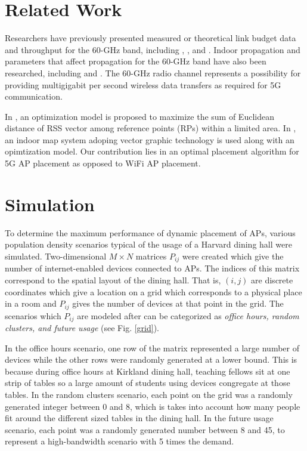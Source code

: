 \documentclass[conference]{IEEEtran}
\begin{document}
\section{Related Work}
	
Researchers have previously presented measured or theoretical link budget data and throughput for the 60-GHz band, including \cite{b2}, \cite{b3}, and \cite{b4}. Indoor propagation and parameters that affect propagation for the 60-GHz band have also been researched, including \cite{b5} and \cite{b6}. The 60-GHz radio channel represents a possibility for providing multigigabit per second wireless data transfers as required for 5G communication. 
	
In \cite{b7}, an optimization model is proposed to maximize the
sum of Euclidean distance of RSS vector among reference
points (RPs) within a limited area. In \cite{b8}, an indoor map system adoping vector graphic technology is used along with an opimtization model. Our contribution lies in an optimal placement algorithm for 5G AP placement as opposed to WiFi AP placement. 

\section{Simulation}

To determine the maximum performance of dynamic placement of APs, various
population density scenarios typical of the usage of a Harvard dining hall were
simulated. Two-dimensional $M\times N$ matrices $P_{ij}$ were created which give the number
of internet-enabled devices connected to APs. The indices of this matrix
correspond to the spatial layout of the dining hall. That is, $(i, j)$
are discrete coordinates which give a location on a grid which corresponds to a
physical place in a room and $P_{ij}$ gives the number of devices at that point
in the grid. The scenarios which $P_{ij}$ are
modeled after can be categorized as \textit{office hours, random clusters, and
future usage} (see Fig. \ref{grid}).

In the office hours scenario, one row of the matrix represented a large number of devices while the other rows were randomly generated at a lower bound. This is because during office hours at Kirkland dining hall, teaching fellows sit at one strip of tables so a large amount of students using devices congregate at those tables. In the random clusters scenario, each point on the grid was a randomly generated integer between 0 and 8, which is takes into account how many people fit around the different sized tables in the dining hall. In the future usage scenario, each point was a randomly generated number between 8 and 45, to represent a high-bandwidth scenario with 5 times the demand. 
\end{document}
